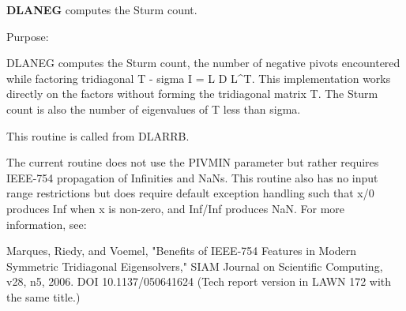 {\bfseries D\+L\+A\+N\+E\+G} computes the Sturm count. 

 \begin{DoxyParagraph}{Purpose\+: }
\begin{DoxyVerb} DLANEG computes the Sturm count, the number of negative pivots
 encountered while factoring tridiagonal T - sigma I = L D L^T.
 This implementation works directly on the factors without forming
 the tridiagonal matrix T.  The Sturm count is also the number of
 eigenvalues of T less than sigma.

 This routine is called from DLARRB.

 The current routine does not use the PIVMIN parameter but rather
 requires IEEE-754 propagation of Infinities and NaNs.  This
 routine also has no input range restrictions but does require
 default exception handling such that x/0 produces Inf when x is
 non-zero, and Inf/Inf produces NaN.  For more information, see:

   Marques, Riedy, and Voemel, "Benefits of IEEE-754 Features in
   Modern Symmetric Tridiagonal Eigensolvers," SIAM Journal on
   Scientific Computing, v28, n5, 2006.  DOI 10.1137/050641624
   (Tech report version in LAWN 172 with the same title.)\end{DoxyVerb}
 
\end{DoxyParagraph}

